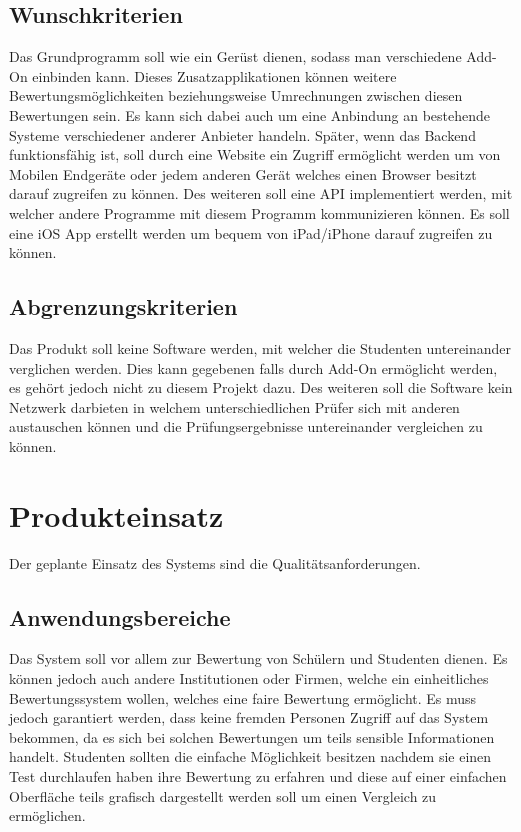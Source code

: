 \documentclass[a4paper,listof=leveldown,listof=numbered]{scrreprt}
\begin{document}
	\section{Wunschkriterien}
	Das Grundprogramm soll wie ein Gerüst dienen, sodass man verschiedene \ac{Add-On} einbinden kann. Dieses Zusatzapplikationen können weitere Bewertungsmöglichkeiten beziehungsweise Umrechnungen zwischen diesen Bewertungen sein. Es kann sich dabei auch um eine Anbindung an bestehende Systeme verschiedener anderer Anbieter handeln. Später, wenn das Backend funktionsfähig ist, soll durch eine Website ein Zugriff ermöglicht werden um von Mobilen Endgeräte oder jedem anderen Gerät welches einen Browser besitzt darauf zugreifen zu können. Des weiteren soll eine \ac{API} implementiert werden, mit welcher andere Programme mit diesem Programm kommunizieren können. Es soll eine iOS App erstellt werden um bequem von iPad/iPhone darauf zugreifen zu können.
	
	\section{Abgrenzungskriterien}
	Das Produkt soll keine Software werden, mit welcher die Studenten untereinander verglichen werden. Dies kann gegebenen falls durch \acs{Add-On} ermöglicht werden, es gehört jedoch nicht zu diesem Projekt dazu. Des weiteren soll die Software kein Netzwerk darbieten in welchem unterschiedlichen Prüfer sich mit anderen austauschen können und die Prüfungsergebnisse untereinander vergleichen zu können.
	
\chapter{Produkteinsatz}
	Der geplante Einsatz des Systems sind die Qualitätsanforderungen.
	
	\section{Anwendungsbereiche}
	Das System soll vor allem zur Bewertung von Schülern und Studenten dienen. Es können jedoch auch andere Institutionen oder Firmen, welche ein einheitliches Bewertungssystem wollen, welches eine faire Bewertung ermöglicht. Es muss jedoch garantiert werden, dass keine fremden Personen Zugriff auf das System bekommen, da es sich bei solchen Bewertungen um teils sensible Informationen handelt. Studenten sollten die einfache Möglichkeit besitzen nachdem sie einen Test durchlaufen haben ihre Bewertung zu erfahren und diese auf einer einfachen Oberfläche teils grafisch dargestellt werden soll um einen Vergleich zu ermöglichen.
	
\end{document}
